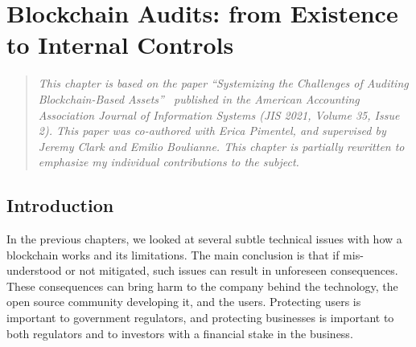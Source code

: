 
\chapter{Blockchain Audits: from Existence to Internal Controls} \label{sec:auditing} 








\begin{quote}
	\textit{This chapter is based on the paper ``Systemizing the Challenges of Auditing Blockchain-Based Assets''~\cite{pimentel2021systemizing} published in the American Accounting Association Journal of Information Systems (JIS 2021, Volume 35, Issue 2). This paper was co-authored with Erica Pimentel, and supervised by Jeremy Clark and Emilio Boulianne. This chapter is partially rewritten to emphasize my individual contributions to the subject.}
\end{quote}



\section{Introduction} \label{sec:auditing:intro}

In the previous chapters, we looked at several subtle technical issues with how a blockchain works and its limitations. The main conclusion is that if mis-understood or not mitigated, such issues can result in unforeseen consequences. These consequences can bring harm to the company behind the technology, the open source community developing it, and the users. Protecting users is important to government regulators, and protecting businesses is important to both regulators and to investors with a financial stake in the business. 

